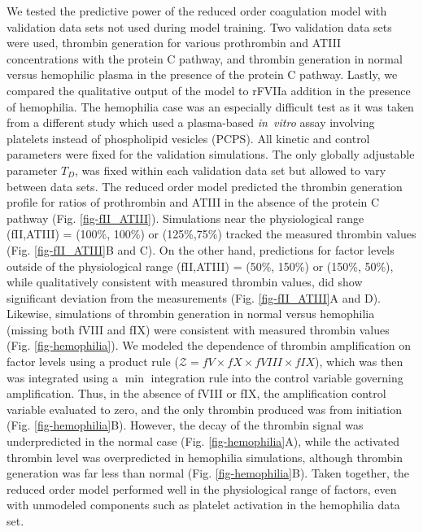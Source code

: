\documentclass[processes,article,received,moreauthors,pdftex,12pt,a4paper]{mdpi}
\begin{document}
We tested the predictive power of the reduced order coagulation model with validation data sets not used during model training. 
Two validation data sets were used, thrombin generation for various prothrombin and ATIII concentrations with the protein C pathway, 
and thrombin generation in normal versus hemophilic plasma in the presence of the protein C pathway. 
Lastly, we compared the qualitative output of the model to rFVIIa addition in the presence of hemophilia.
The hemophilia case was an especially difficult test as it was taken from a different study which used a plasma-based
\textit{in~vitro} assay involving platelets instead of phospholipid vesicles (PCPS). 
All kinetic and control parameters were fixed for the validation simulations. 
The only globally adjustable parameter $T_{D}$, was fixed within each validation data set but allowed to vary between data sets.
The reduced order model predicted the thrombin generation profile for ratios of prothrombin and ATIII in the absence of the protein C pathway (Fig. \ref{fig-fII_ATIII}).
Simulations near the physiological range (fII,ATIII) = (100\%, 100\%) or (125\%,75\%) tracked the measured thrombin values (Fig. \ref{fig-fII_ATIII}B and C).
On the other hand, predictions for factor levels outside of the physiological range (fII,ATIII) = (50\%, 150\%) or (150\%, 50\%), while qualitatively consistent with measured thrombin values, did show significant 
deviation from the measurements (Fig. \ref{fig-fII_ATIII}A and D).
Likewise, simulations of thrombin generation in normal versus hemophilia (missing both fVIII and fIX) were consistent with measured thrombin values (Fig. \ref{fig-hemophilia}).
We modeled the dependence of thrombin amplification on factor levels using a product rule ($\mathcal{Z} = fV\times fX\times fVIII\times fIX$), 
which was then was integrated using a $\min$ integration rule into the control variable governing amplification. 
Thus, in the absence of fVIII or fIX, the amplification control variable evaluated to zero, and the only thrombin produced was from initiation (Fig. \ref{fig-hemophilia}B).
However, the decay of the thrombin signal was underpredicted in the normal case (Fig. \ref{fig-hemophilia}A), while the activated thrombin level was overpredicted 
in hemophilia simulations, although thrombin generation was far less than normal (Fig. \ref{fig-hemophilia}B). 
Taken together, the reduced order model performed well in the physiological range of factors, even with
unmodeled components such as platelet activation in the hemophilia data set. 
\end{document}
